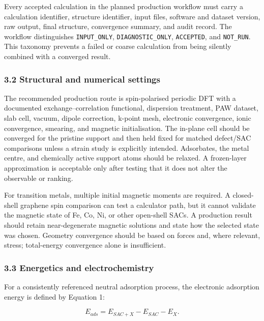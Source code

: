 \documentclass[
]{article}
\begin{document}
Every accepted calculation in the planned production workflow must carry
a calculation identifier, structure identifier, input files, software
and dataset version, raw output, final structure, convergence summary,
and audit record. The workflow distinguishes \texttt{INPUT\_ONLY},
\texttt{DIAGNOSTIC\_ONLY}, \texttt{ACCEPTED}, and \texttt{NOT\_RUN}.
This taxonomy prevents a failed or coarse calculation from being
silently combined with a converged result.

\hypertarget{structural-and-numerical-settings}{%
\subsubsection{3.2 Structural and numerical
settings}\label{structural-and-numerical-settings}}

The recommended production route is spin-polarised periodic DFT with a
documented exchange--correlation functional, dispersion treatment, PAW
dataset, slab cell, vacuum, dipole correction, k-point mesh, electronic
convergence, ionic convergence, smearing, and magnetic initialisation.
The in-plane cell should be converged for the pristine support and then
held fixed for matched defect/SAC comparisons unless a strain study is
explicitly intended. Adsorbates, the metal centre, and chemically active
support atoms should be relaxed. A frozen-layer approximation is
acceptable only after testing that it does not alter the observable or
ranking.

For transition metals, multiple initial magnetic moments are required. A
closed-shell graphene spin comparison can test a calculator path, but it
cannot validate the magnetic state of Fe, Co, Ni, or other open-shell
SACs. A production result should retain near-degenerate magnetic
solutions and state how the selected state was chosen. Geometry
convergence should be based on forces and, where relevant, stress;
total-energy convergence alone is insufficient.

\hypertarget{energetics-and-electrochemistry}{%
\subsubsection{3.3 Energetics and
electrochemistry}\label{energetics-and-electrochemistry}}

For a consistently referenced neutral adsorption process, the electronic
adsorption energy is defined by Equation 1:

\[
E_{ads}=E_{SAC+X}-E_{SAC}-E_X. \tag{1}
\]
\end{document}
